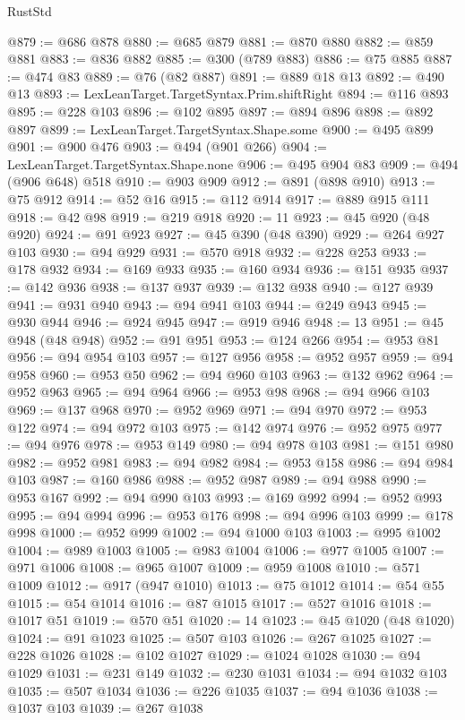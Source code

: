 \begin{lexlean}{RustStd}
\begin{coremodule}
@879 := @686 @878
@880 := @685 @879
@881 := @870 @880
@882 := @859 @881
@883 := @836 @882
@885 := @300 (@789 @883)
@886 := @75 @885
@887 := @474 @83
@889 := @76 (@82 @887)
@891 := @889 @18 @13
@892 := @490 @13
@893 := LexLeanTarget.TargetSyntax.Prim.shiftRight
@894 := @116 @893
@895 := @228 @103
@896 := @102 @895
@897 := @894 @896
@898 := @892 @897
@899 := LexLeanTarget.TargetSyntax.Shape.some
@900 := @495 @899
@901 := @900 @476
@903 := @494 (@901 @266)
@904 := LexLeanTarget.TargetSyntax.Shape.none
@906 := @495 @904 @83
@909 := @494 (@906 @648) @518
@910 := @903 @909
@912 := @891 (@898 @910)
@913 := @75 @912
@914 := @52 @16
@915 := @112 @914
@917 := @889 @915 @111
@918 := @42 @98
@919 := @219 @918
@920 := 11
@923 := @45 @920 (@48 @920)
@924 := @91 @923
@927 := @45 @390 (@48 @390)
@929 := @264 @927 @103
@930 := @94 @929
@931 := @570 @918
@932 := @228 @253
@933 := @178 @932
@934 := @169 @933
@935 := @160 @934
@936 := @151 @935
@937 := @142 @936
@938 := @137 @937
@939 := @132 @938
@940 := @127 @939
@941 := @931 @940
@943 := @94 @941 @103
@944 := @249 @943
@945 := @930 @944
@946 := @924 @945
@947 := @919 @946
@948 := 13
@951 := @45 @948 (@48 @948)
@952 := @91 @951
@953 := @124 @266
@954 := @953 @81
@956 := @94 @954 @103
@957 := @127 @956
@958 := @952 @957
@959 := @94 @958
@960 := @953 @50
@962 := @94 @960 @103
@963 := @132 @962
@964 := @952 @963
@965 := @94 @964
@966 := @953 @98
@968 := @94 @966 @103
@969 := @137 @968
@970 := @952 @969
@971 := @94 @970
@972 := @953 @122
@974 := @94 @972 @103
@975 := @142 @974
@976 := @952 @975
@977 := @94 @976
@978 := @953 @149
@980 := @94 @978 @103
@981 := @151 @980
@982 := @952 @981
@983 := @94 @982
@984 := @953 @158
@986 := @94 @984 @103
@987 := @160 @986
@988 := @952 @987
@989 := @94 @988
@990 := @953 @167
@992 := @94 @990 @103
@993 := @169 @992
@994 := @952 @993
@995 := @94 @994
@996 := @953 @176
@998 := @94 @996 @103
@999 := @178 @998
@1000 := @952 @999
@1002 := @94 @1000 @103
@1003 := @995 @1002
@1004 := @989 @1003
@1005 := @983 @1004
@1006 := @977 @1005
@1007 := @971 @1006
@1008 := @965 @1007
@1009 := @959 @1008
@1010 := @571 @1009
@1012 := @917 (@947 @1010)
@1013 := @75 @1012
@1014 := @54 @55
@1015 := @54 @1014
@1016 := @87 @1015
@1017 := @527 @1016
@1018 := @1017 @51
@1019 := @570 @51
@1020 := 14
@1023 := @45 @1020 (@48 @1020)
@1024 := @91 @1023
@1025 := @507 @103
@1026 := @267 @1025
@1027 := @228 @1026
@1028 := @102 @1027
@1029 := @1024 @1028
@1030 := @94 @1029
@1031 := @231 @149
@1032 := @230 @1031
@1034 := @94 @1032 @103
@1035 := @507 @1034
@1036 := @226 @1035
@1037 := @94 @1036
@1038 := @1037 @103
@1039 := @267 @1038

\end{coremodule}
\end{lexlean}

